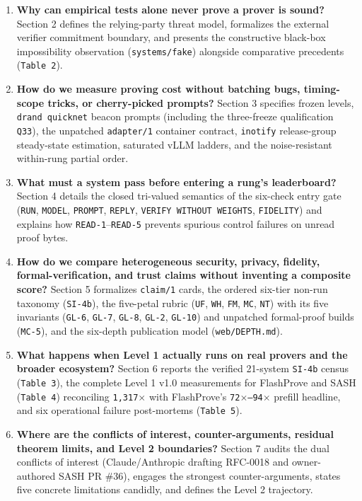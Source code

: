 \documentclass[11pt,letterpaper]{article}
\begin{document}
\begin{enumerate}
\item \textbf{Why can empirical tests alone never prove a prover is sound?} Section 2 defines the relying-party threat model, formalizes the external verifier commitment boundary, and presents the constructive black-box impossibility observation (\texttt{systems/\allowbreak{}fake}) alongside comparative precedents (\texttt{Table 2}).
\item \textbf{How do we measure proving cost without batching bugs, timing-scope tricks, or cherry-picked prompts?} Section 3 specifies frozen levels, \texttt{drand quicknet} beacon prompts (including the three-freeze qualification \texttt{Q33}), the unpatched \texttt{adapter/\allowbreak{}1} container contract, \texttt{inotify} release-group steady-state estimation, saturated vLLM ladders, and the noise-resistant within-rung partial order.
\item \textbf{What must a system pass before entering a rung's leaderboard?} Section 4 details the closed tri-valued semantics of the six-check entry gate (\texttt{RUN}, \texttt{MODEL}, \texttt{PROMPT}, \texttt{REPLY}, \texttt{VERIFY WITHOUT WEIGHTS}, \texttt{FIDELITY}) and explains how \texttt{READ-1}--\texttt{READ-5} prevents spurious control failures on unread proof bytes.
\item \textbf{How do we compare heterogeneous security, privacy, fidelity, formal-verification, and trust claims without inventing a composite score?} Section 5 formalizes \texttt{claim/\allowbreak{}1} cards, the ordered six-tier non-run taxonomy (\texttt{SI-4b}), the five-petal rubric (\texttt{UF}, \texttt{WH}, \texttt{FM}, \texttt{MC}, \texttt{NT}) with its five invariants (\texttt{GL-6}, \texttt{GL-7}, \texttt{GL-8}, \texttt{GL-2}, \texttt{GL-10}) and unpatched formal-proof builds (\texttt{MC-5}), and the six-depth publication model (\texttt{web/\allowbreak{}DEPTH.\allowbreak{}md}).
\item \textbf{What happens when Level 1 actually runs on real provers and the broader ecosystem?} Section 6 reports the verified 21-system \texttt{SI-4b} census (\texttt{Table 3}), the complete Level 1 v1.0 measurements for FlashProve and SASH (\texttt{Table 4}) reconciling \texttt{1,317$\times$} with FlashProve's \texttt{72$\times$--94$\times$} prefill headline, and six operational failure post-mortems (\texttt{Table 5}).
\item \textbf{Where are the conflicts of interest, counter-arguments, residual theorem limits, and Level 2 boundaries?} Section 7 audits the dual conflicts of interest (Claude/Anthropic drafting RFC-0018 and owner-authored SASH PR \#36), engages the strongest counter-arguments, states five concrete limitations candidly, and defines the Level 2 trajectory.
\end{enumerate}
\end{document}
